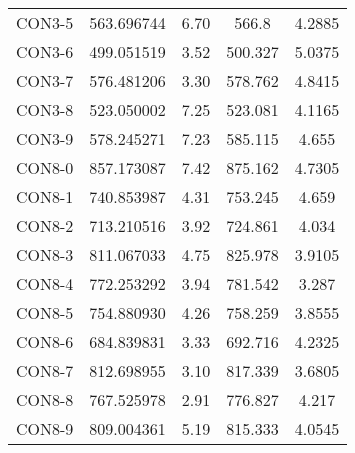 \begin{table}[ht]
\begin{tabular}{c c c c c}
CON3-5 & 563.696744 & 6.70 & 566.8 & 4.2885 \\
CON3-6 & 499.051519 & 3.52 & 500.327 & 5.0375 \\
CON3-7 & 576.481206 & 3.30 & 578.762 & 4.8415 \\
CON3-8 & 523.050002 & 7.25 & 523.081 & 4.1165 \\
CON3-9 & 578.245271 & 7.23 & 585.115 & 4.655 \\
CON8-0 & 857.173087 & 7.42 & 875.162 & 4.7305 \\
CON8-1 & 740.853987 & 4.31 & 753.245 & 4.659 \\
CON8-2 & 713.210516 & 3.92 & 724.861 & 4.034 \\
CON8-3 & 811.067033 & 4.75 & 825.978 & 3.9105 \\
CON8-4 & 772.253292 & 3.94 & 781.542 & 3.287 \\
CON8-5 & 754.880930 & 4.26 & 758.259 & 3.8555 \\
CON8-6 & 684.839831 & 3.33 & 692.716 & 4.2325 \\
CON8-7 & 812.698955 & 3.10 & 817.339 & 3.6805 \\
CON8-8 & 767.525978 & 2.91 & 776.827 & 4.217 \\
CON8-9 & 809.004361 & 5.19 & 815.333 & 4.0545 \\
[1ex]\hline
\end{tabular}
\label{table:nonlin}
\end{table} \clearpage
